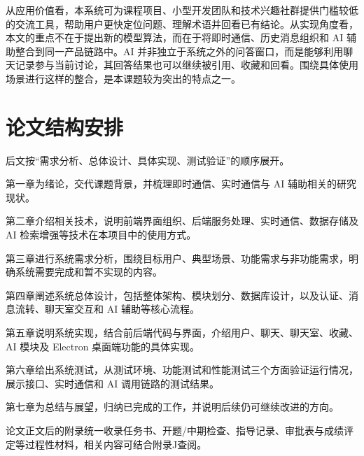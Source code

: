 从应用价值看，本系统可为课程项目、小型开发团队和技术兴趣社群提供门槛较低的交流工具，帮助用户更快定位问题、理解术语并回看已有结论。从实现角度看，本文的重点不在于提出新的模型算法，而在于将即时通信、历史消息组织和 AI 辅助整合到同一产品链路中。AI 并非独立于系统之外的问答窗口，而是能够利用聊天记录参与当前讨论，其回答结果也可以继续被引用、收藏和回看。围绕具体使用场景进行这样的整合，是本课题较为突出的特点之一。

\section{论文结构安排}

后文按“需求分析、总体设计、具体实现、测试验证”的顺序展开。

第一章为绪论，交代课题背景，并梳理即时通信、实时通信与 AI 辅助相关的研究现状。

第二章介绍相关技术，说明前端界面组织、后端服务处理、实时通信、数据存储及 AI 检索增强等技术在本项目中的使用方式。

第三章进行系统需求分析，围绕目标用户、典型场景、功能需求与非功能需求，明确系统需要完成和暂不实现的内容。

第四章阐述系统总体设计，包括整体架构、模块划分、数据库设计，以及认证、消息流转、聊天室交互和 AI 辅助等核心流程。

第五章说明系统实现，结合前后端代码与界面，介绍用户、聊天、聊天室、收藏、AI 模块及 Electron 桌面端功能的具体实现。

第六章给出系统测试，从测试环境、功能测试和性能测试三个方面验证运行情况，展示接口、实时通信和 AI 调用链路的测试结果。

第七章为总结与展望，归纳已完成的工作，并说明后续仍可继续改进的方向。

论文正文后的附录统一收录任务书、开题/中期检查、指导记录、审批表与成绩评定等过程性材料，相关内容可结合附录J查阅。
